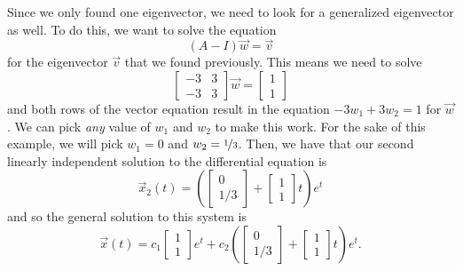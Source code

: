 \begin{exampleSol}
Since we only found one eigenvector, we need to look for a generalized eigenvector as well. To do this, we want to solve the equation
\begin{equation*}
(A - I)\vec{w} = \vec{v}
\end{equation*} 
for the eigenvector $\vec{v}$ that we found previously. This means we need to solve
\begin{equation*}
\begin{bmatrix} -3 & 3 \\ -3 & 3 \end{bmatrix} \vec{w} = \begin{bmatrix} 1 \\ 1 \end{bmatrix}
\end{equation*}
and both rows of the vector equation result in the equation $-3w_1 + 3w_2 = 1$ for $\vec{w}$. We can pick \emph{any} value of $w_1$ and $w_2$ to make this work. For the sake of this example, we will pick $w_1 = 0$ and $w_2 = \nicefrac{1}{3}$. Then, we have that our second linearly independent solution to the differential equation is
\begin{equation*}
\vec{x}_2(t) = \left(\begin{bmatrix} 0 \\ 1/3 \end{bmatrix} + \begin{bmatrix} 1 \\ 1 \end{bmatrix} t \right) e^{t}
\end{equation*}
and so the general solution to this system is
\begin{equation*}
\vec{x}(t) = c_1 \begin{bmatrix} 1 \\ 1 \end{bmatrix} e^t + c_2 \left(\begin{bmatrix} 0 \\ 1/3 \end{bmatrix} + \begin{bmatrix} 1 \\ 1 \end{bmatrix} t \right) e^{t}.
\end{equation*}


\end{exampleSol}
